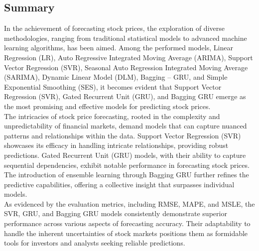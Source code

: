 \documentclass{ieeeojies}
\begin{document}
\subsection{Summary}
In the achievement of forecasting stock prices, the exploration of diverse methodologies, ranging from traditional statistical models to advanced machine learning algorithms, has been aimed. Among the performed models, Linear Regression (LR), Auto Regressive Integrated Moving Average (ARIMA), Support Vector Regression (SVR), Seasonal Auto Regression Integrated Moving Average (SARIMA), Dynamic Linear Model (DLM), Bagging – GRU, and Simple Exponential Smoothing (SES), it becomes evident that Support Vector Regression (SVR), Gated Recurrent Unit (GRU), and Bagging GRU emerge as the most promising and effective models for predicting stock prices.\\
The intricacies of stock price forecasting, rooted in the complexity and unpredictability of financial markets, demand models that can capture nuanced patterns and relationships within the data. Support Vector Regression (SVR) showcases its efficacy in handling intricate relationships, providing robust predictions. Gated Recurrent Unit (GRU) models, with their ability to capture sequential dependencies, exhibit notable performance in forecasting stock prices. The introduction of ensemble learning through Bagging GRU further refines the predictive capabilities, offering a collective insight that surpasses individual models.\\
As evidenced by the evaluation metrics, including RMSE, MAPE, and MSLE, the SVR, GRU, and Bagging GRU models consistently demonstrate superior performance across various aspects of forecasting accuracy. Their adaptability to handle the inherent uncertainties of stock markets positions them as formidable tools for investors and analysts seeking reliable predictions.
\end{document}
